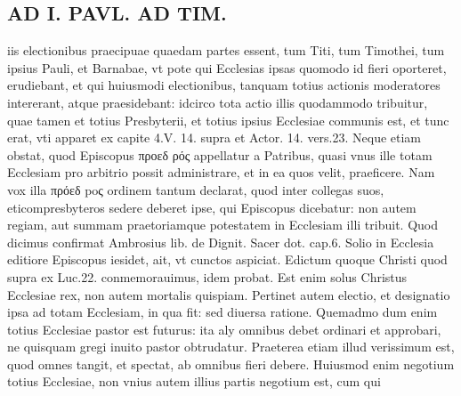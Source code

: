 \documentclass{article}
\begin{document}
\begin{pages}
\section*{AD I. PAVL. AD TIM. }
\marginpar{[ p.043 ]}\pstart iis electionibus praecipuae quaedam partes essent, tum Titi, tum Timothei, tum ipsius Pauli, et Barnabae, vt pote qui Ecclesias ipsas quomodo id fieri oporteret, erudiebant, et qui huiusmodi electionibus, tanquam totius actionis moderatores intererant, atque praesidebant: idcirco tota actio illis quodammodo tribuitur, quae tamen et totius Presbyterii, et totius ipsius Ecclesiae communis est, et tunc erat, vti apparet ex capite 4.V. 14. supra et Actor. 14. vers.23. Neque etiam obstat, quod Episcopus προεδ ρός appellatur a Patribus, quasi vnus ille totam Ecclesiam pro arbitrio possit administrare, et in ea quos velit, praeficere. Nam vox illa πρόεδ poς ordinem tantum declarat, quod inter collegas suos, eticompresbyteros sedere deberet ipse, qui Episcopus dicebatur: non autem regiam, aut summam praetoriamque potestatem in Ecclesiam illi tribuit. Quod dicimus confirmat Ambrosius lib.  de Dignit. Sacer dot. cap.6. Solio in Ecclesia editiore Episcopus iesidet, ait, vt cunctos aspiciat. Edictum quoque Christi quod supra ex Luc.22. conmemorauimus, idem probat. Est enim solus Christus Ecclesiae rex, non autem mortalis quispiam. Pertinet autem electio, et designatio ipsa ad totam Ecclesiam, in qua fit: sed diuersa ratione. Quemadmo dum enim totius Ecclesiae pastor est futurus: ita aly omnibus debet ordinari et approbari, ne quisquam gregi inuito pastor obtrudatur. Praeterea etiam illud verissimum est, quod omnes tangit, et spectat, ab omnibus fieri debere. Huiusmod enim negotium totius Ecclesiae, non vnius autem illius partis negotium est, cum qui  \pend

\end{pages}
\end{document}
